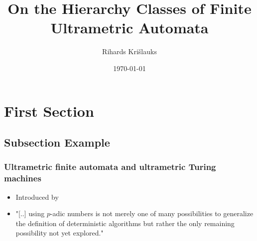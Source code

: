 \documentclass{beamer}
\title{On the Hierarchy Classes of Finite Ultrametric Automata} %
\author{Rihards Kri\v{s}lauks} %
\institute[LU] %
{
University of Latvia Faculty of Computing \\ %
}
\date{\today} %
\begin{document}
\begin{frame}
\titlepage %
\end{frame}

\section{First Section} %

\subsection{Subsection Example} %

\begin{frame}
\frametitle{Ultrametric finite automata and ultrametric Turing machines}
\begin{itemize}
	\item Introduced by \cite{Freivalds2012}
	\item "[..] using $p$-adic numbers is not merely one of many possibilities to generalize the definition of deterministic algorithms but rather the only remaining possibility not yet explored."
\end{itemize}
\end{frame}
\end{document}
